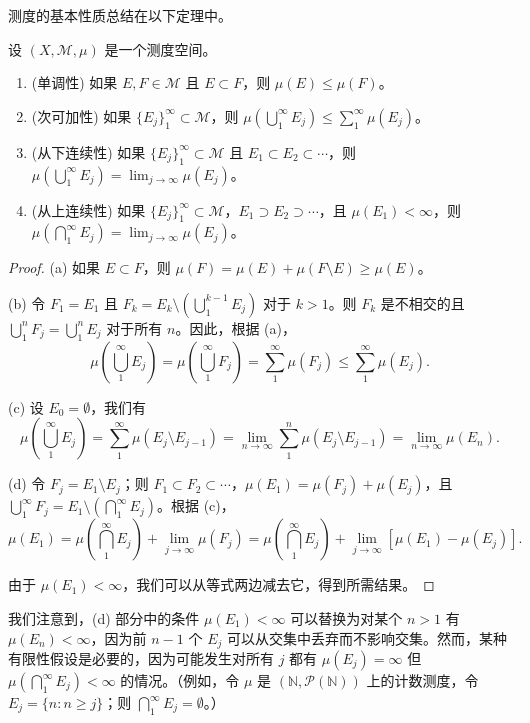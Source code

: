 \documentclass[lang=cn,10pt,thmcnt=section]{elegantbook}
\begin{document}
测度的基本性质总结在以下定理中。

\begin{theorem}\label{theorem1.8}
设 $(X, \mathcal{M}, \mu)$ 是一个测度空间。
\begin{enumerate}[label=\alph*.]
\item (单调性) 如果 $E, F \in \mathcal{M}$ 且 $E \subset F$，则 $\mu(E) \leq \mu(F)$。
\item (次可加性) 如果 $\{E_j\}_1^\infty \subset \mathcal{M}$，则 $\mu(\bigcup_1^\infty E_j) \leq \sum_1^\infty \mu(E_j)$。
\item (从下连续性) 如果 $\{E_j\}_1^\infty \subset \mathcal{M}$ 且 $E_1 \subset E_2 \subset \cdots$，则 $\mu(\bigcup_1^\infty E_j) = \lim_{j\to\infty} \mu(E_j)$。
\item (从上连续性) 如果 $\{E_j\}_1^\infty \subset \mathcal{M}$，$E_1 \supset E_2 \supset \cdots$，且 $\mu(E_1) < \infty$，则 $\mu(\bigcap_1^\infty E_j) = \lim_{j\to\infty} \mu(E_j)$。
\end{enumerate}
\end{theorem}

\begin{proof}
(a) 如果 $E \subset F$，则 $\mu(F) = \mu(E) + \mu(F \setminus E) \geq \mu(E)$。

(b) 令 $F_1 = E_1$ 且 $F_k = E_k \setminus (\bigcup_1^{k-1} E_j)$ 对于 $k > 1$。则 $F_k$ 是不相交的且 $\bigcup_1^n F_j = \bigcup_1^n E_j$ 对于所有 $n$。因此，根据 (a)，
\[\mu\left(\bigcup_1^\infty E_j\right) = \mu\left(\bigcup_1^\infty F_j\right) = \sum_1^\infty \mu(F_j) \leq \sum_1^\infty \mu(E_j).\]

(c) 设 $E_0 = \emptyset$，我们有
\[\mu\left(\bigcup_1^\infty E_j\right) = \sum_1^\infty \mu(E_j \setminus E_{j-1}) = \lim_{n\to\infty} \sum_1^n \mu(E_j \setminus E_{j-1}) = \lim_{n\to\infty} \mu(E_n).\]

(d) 令 $F_j = E_1 \setminus E_j$；则 $F_1 \subset F_2 \subset \cdots$，$\mu(E_1) = \mu(F_j) + \mu(E_j)$，且 $\bigcup_1^\infty F_j = E_1 \setminus (\bigcap_1^\infty E_j)$。根据 (c)，
\[\mu(E_1) = \mu\left(\bigcap_1^\infty E_j\right) + \lim_{j\to\infty} \mu(F_j) = \mu\left(\bigcap_1^\infty E_j\right) + \lim_{j\to\infty} [\mu(E_1) - \mu(E_j)].\]

由于 $\mu(E_1) < \infty$，我们可以从等式两边减去它，得到所需结果。
\end{proof}

我们注意到，(d) 部分中的条件 $\mu(E_1) < \infty$ 可以替换为对某个 $n > 1$ 有 $\mu(E_n) < \infty$，因为前 $n-1$ 个 $E_j$ 可以从交集中丢弃而不影响交集。然而，某种有限性假设是必要的，因为可能发生对所有 $j$ 都有 $\mu(E_j) = \infty$ 但 $\mu(\bigcap_1^\infty E_j) < \infty$ 的情况。（例如，令 $\mu$ 是 $(\mathbb{N}, \mathcal{P}(\mathbb{N}))$ 上的计数测度，令 $E_j = \{n : n \geq j\}$；则 $\bigcap_1^\infty E_j = \emptyset$。）
\end{document}

